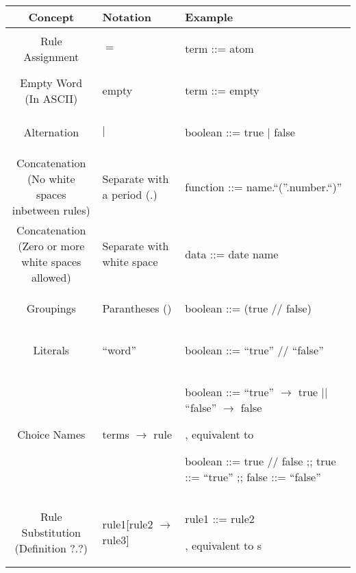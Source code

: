 \begin{center}
  \begin{tabular}{ | c | p{2cm} | p{6cm} | }
  \hline
  \textbf{Concept} & \textbf{Notation} & \textbf{Example} \\
  \hline
  Rule Assignment & $=$ & \begin{bnf} term ::= atom\end{bnf}\\
  \hline
  \makecell{Empty Word \\ (In ASCII)} & empty & \begin{bnf} term ::= empty\end{bnf}\\
  \hline
  Alternation & $|$ & \begin{bnf} boolean ::= true | false \end{bnf}\\
  \hline
  \makecell{Concatenation \\ (No white spaces \\ inbetween rules)} & \makecell{Separate with \\  a period (.)}&  \begin{bnf} function ::= name.``(''.number.``)''\end{bnf} \\
  \hline
  \makecell{Concatenation \\ (Zero or more \\ white spaces allowed)} & \makecell{Separate with \\ white space} & \begin{bnf} data ::= date name\end{bnf} \\
  \hline
  Groupings & Parantheses () & \begin{bnf} boolean ::= (true // false)\end{bnf} \\
  \hline
  Literals & ``word'' & \begin{bnf} boolean ::= ``true'' // ``false'' \end{bnf} \\
  \hline
  Choice Names & terms $\to$ rule & \makecell{\begin{bnf} boolean ::= ``true'' $\to$ true || ``false'' $\to$ false \end{bnf}, \\ equivalent to \\ \begin{bnf}  boolean ::= true // false ;; true ::= ``true'' ;; false ::= ``false'' \end{bnf}} \\
  \hline
  \makecell{Rule Substitution \\ (Definition ?.?)} & rule1[rule2 $\to$ rule3] & \makecell{\begin{bnf} rule1 ::= rule2 \end{bnf}, \\ equivalent to \\ s } \\
    \hline
  \end{tabular}
  \end{center}

